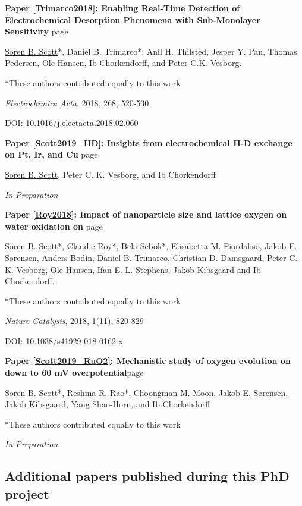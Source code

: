 \noindent\textbf{Paper \ref{Trimarco2018}: Enabling Real-Time Detection of Electrochemical Desorption Phenomena with Sub-Monolayer Sensitivity} \hfill page~\pageref{Trimarco2018}

		\underline{Soren B. Scott}*, Daniel B. Trimarco*, Anil H. Thilsted, Jesper Y. Pan, Thomas Pedersen, Ole Hansen, Ib Chorkendorff, and Peter C.K. Vesborg. 
		
		*These authors contributed equally to this work
		
		\textit{Electrochimica Acta}, 2018, 268, 520-530
		
		DOI: 10.1016/j.electacta.2018.02.060

\vspace{5mm}
\noindent\textbf{Paper \ref{Scott2019_HD}: Insights from electrochemical H-D exchange on Pt, Ir, and Cu} \hfill page~\pageref{Scott2019_HD}

		\underline{Soren B. Scott}, Peter C. K. Vesborg, and Ib Chorkendorff

		\textit{In Preparation}


\vspace{5mm}
\noindent\textbf{Paper \ref{Roy2018}: Impact of nanoparticle size and lattice oxygen on water oxidation on } \hfill page~\pageref{Roy2018}

	\underline{Soren B. Scott}*, Claudie Roy*, Bela Sebok*, Elisabetta M. Fiordaliso, Jakob E. Sørensen, Anders Bodin, Daniel B. Trimarco, Christian D. Damsgaard, Peter C. K. Vesborg, Ole Hansen, Ifan E. L. Stephens, Jakob Kibsgaard and Ib Chorkendorff. 

	*These authors contributed equally to this work
	
	\textit{Nature Catalysis}, 2018, 1(11), 820-829 
	
	DOI: 10.1038/s41929-018-0162-x

\vspace{5mm}
\noindent\textbf{Paper \ref{Scott2019_RuO2}: Mechanistic study of oxygen evolution on  down to 60 mV overpotential}\hfill page~\pageref{Scott2019_RuO2}

	\underline{Soren B. Scott}*, Reshma R. Rao*, Choongman M. Moon, Jakob E. S\o rensen, Jakob Kibsgaard, Yang Shao-Horn, and Ib Chorkendorff
	
	*These authors contributed equally to this work
	
	\textit{In Preparation}

\clearpage
\subsection*{Additional papers published during this PhD project}


